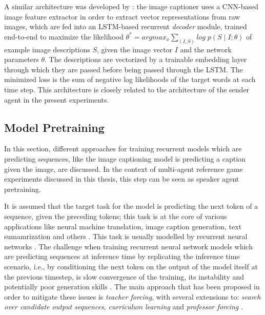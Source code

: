  A similar architecture was developed by \cite{vinyals2015show}: the image captioner uses a CNN-based image feature extractor in order to extract vector representations from raw images, which are fed into an LSTM-based recurrent \textit{decoder} module, trained end-to-end to maximize the likelihood $\theta^* = argmax_{x} \sum_{(I, S)} log\; p(S \mid I; \theta)$ of example image descriptions $S$, given the image vector $I$ and the network parameters $\theta$. The descriptions are vectorized by a trainable embedding layer through which they are passed before being passed through the LSTM.  The minimized loss is the sum of negative log likelihoods of the target words at each time step. 
This architecture is closely related to the architecture of the sender agent in the present experiments. 

\subsection{Model Pretraining}

In this section, different approaches for training recurrent models which are predicting sequences, like the image captioning model is predicting a caption given the image, are discussed. In the context of multi-agent reference game experiments discussed in this thesis, this step can be seen as speaker agent pretraining.

It is assumed that the target task for the model is predicting the next token of a sequence, given the preceding tokens; this task is at the core of various applications like neural machine translation, image caption generation, text sumamrization and others . This task is usually modelled by recurrent neural networks . The challenge when training recurrent neural network models which are predicting sequences at inference time by replicating the inference time scenario, i.e., by conditioning the next token on the output of the model itself at the previous timestep, is slow convergence of the training, its instability and potentially poor generation skills . The main approach that has been proposed in order to mitigate these issues is \textit{teacher forcing}, with several extensions to: \textit{search over candidate output sequences}, \textit{curriculum learning} and \textit{professor forcing} \parencite{goodfellow2016deep, williams1989algorithm}.

